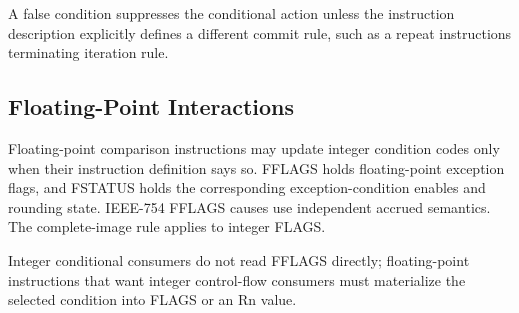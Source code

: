 A false condition suppresses the conditional action unless the instruction description explicitly defines a different
commit rule, such as a repeat instruction\textquotesingle{}s terminating iteration rule.

\subsection{Floating-Point Interactions}
Floating-point comparison instructions may update integer condition codes only when their instruction definition says
so. FFLAGS holds floating-point exception flags, and FSTATUS holds the corresponding exception-condition enables
and rounding state. IEEE-754 FFLAGS causes use independent accrued semantics. The complete-image rule applies to
integer FLAGS.

Integer conditional consumers do not read FFLAGS directly; floating-point instructions that want integer control-flow
consumers must materialize the selected condition into FLAGS or an Rn value.
